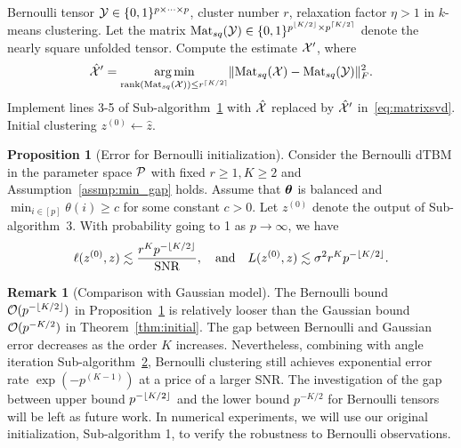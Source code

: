 \documentclass[journal]{IEEEtran}
\theoremstyle{definition}
\newtheorem{prop}{Proposition}
\theoremstyle{definition}
\newtheorem{rmk}{Remark}
\newcommand{\of}[1]{\left(#1\right)}
\DeclarePairedDelimiter{\ceil}{\lceil}{\rceil}
\DeclarePairedDelimiter{\floor}{\lfloor}{\rfloor}
\begin{document}
\begin{itemize}[wide]
\begin{algorithm}[h!]
\caption*{\bf Sub-algorithm 3: Weighted higher-order initialization for Bernoulli observation}
\vspace{.15cm}
\begin{algorithmic}[1] 
\INPUT Bernoulli tensor $\mathcal{Y} \in \{0,1\}^{p\times \cdots \times p}$, cluster number $r$, relaxation factor $\eta > 1$ in $k$-means clustering.
\State  Let the matrix $\mat_{sq} (\tY) \in \{0,1\}^{p^{\floor{K/2}} \times p^{\ceil{K/2}} }$ denote the nearly square unfolded tensor. Compute the estimate $\mathcal{X}'$, where
\small
\begin{equation}\label{eq:matrixsvd}
    \hat \tX' = \argmin_{\text{rank}(\mat_{sq}(\tX)) \leq r^{\ceil{K/2}}} \onormSize{}{ \mat_{sq}(\tX) -  \mat_{sq}(\tY)}_F^2.
\end{equation}
\normalsize
\State Implement lines 3-5 of Sub-algorithm~\hyperref[alg:main]{1} with $\hat {\mathcal{X}}$ replaced by $\hat {\mathcal{X}}'$ in~\eqref{eq:matrixsvd}.
\OUTPUT Initial clustering $z^{(0)} \leftarrow \hat z$.
\end{algorithmic}
\end{algorithm}

\begin{prop}[Error for Bernoulli initialization]\label{prop:ber} Consider the Bernoulli dTBM in the parameter space $\mathcal{P}$ {with fixed $r \geq 1, K \geq 2$} and Assumption~\ref{assmp:min_gap} holds. Assume that $\boldsymbol{\theta}$ is balanced and $\min_{i\in[p]}\theta(i) \geq c$ for some constant $c>0$. Let $ z^{(0)}$ denote the output of Sub-algorithm~3. With probability going to 1 {as $p \rightarrow \infty$}, we have
\begin{equation}\label{eq:ini_b}
 \ell(z^{(0)}, z) \lesssim \frac{r^K p^{- \floor{K/2} }}{\text{SNR}}, \quad \text{and} \quad L(z^{(0)}, z) \lesssim  {\sigma^2 r^K p^{-\floor{K/2}}}.
\end{equation}
\end{prop}

\begin{rmk}[Comparison with Gaussian model] The Bernoulli bound $\tO(p^{- \floor{K/2} })$ in Proposition~\ref{prop:ber} is relatively looser than the Gaussian bound $\mathcal{O}(p^{- K/2 })$ in Theorem~\ref{thm:initial}. The gap between Bernoulli and Gaussian error decreases as the order $K$ increases. Nevertheless, combining with angle iteration Sub-algorithm~\hyperref[alg:main]{2}, Bernoulli clustering still achieves exponential error rate $\exp \of{ - p^{(K-1)}}$ at a price of a larger SNR.
The investigation of the gap between upper bound $p^{- \floor{K/2}}$ and the lower bound $p^{- K/2}$ for Bernoulli tensors will be left as future work. In numerical experiments, we will use our original initialization, Sub-algorithm 1, to verify the robustness to Bernoulli observations.
\end{rmk}


\end{itemize}
\end{document}
